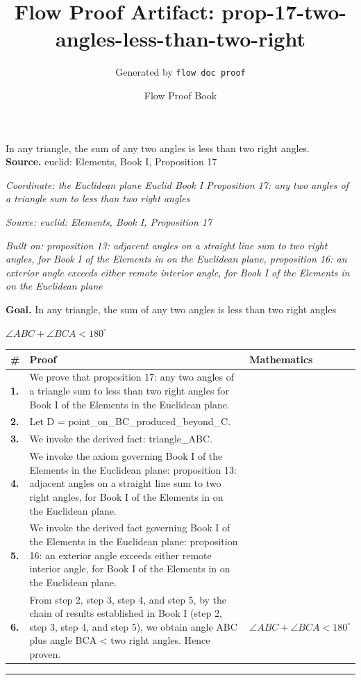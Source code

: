 \documentclass[11pt]{article}
\title{Flow Proof Artifact: prop-17-two-angles-less-than-two-right}
\author{Generated by \texttt{flow doc proof}}
\date{Flow Proof Book}
\theoremstyle{definition}
\begin{document}
\maketitle
In any triangle, the sum of any two angles is less than two right angles.\\[0.5em]
\textbf{Source.} euclid: Elements, Book I, Proposition 17\\[0.5em]
\bigskip
{}\par
\smallskip\noindent\textit{Coordinate: the Euclidean plane \cdot Euclid Book I \cdot Proposition 17: any two angles of a triangle sum to less than two right angles}\par
\smallskip\noindent\textit{Source: euclid: Elements, Book I, Proposition 17}\par
\smallskip\noindent\textit{Built on: proposition 13: adjacent angles on a straight line sum to two right angles, for Book I of the Elements in on the Euclidean plane, proposition 16: an exterior angle exceeds either remote interior angle, for Book I of the Elements in on the Euclidean plane}\par
\medskip
\noindent\textbf{Goal.} In any triangle, the sum of any two angles is less than two right angles\par
\noindent$\displaystyle \angle ABC + \angle BCA < 180^\circ$\par
\medskip
\noindent
\begin{tabular}{@{} >{\raggedright\arraybackslash}p{} >{\raggedright\arraybackslash}p{} >{\raggedleft\arraybackslash}p{} @{}}
\textbf{\#} & \textbf{Proof} & \textbf{Mathematics} \\
\midrule
\textbf{1.} & We prove that proposition 17: any two angles of a triangle sum to less than two right angles for Book I of the Elements in the Euclidean plane. & \\[0.45em]
\textbf{2.} & Let D = point\_on\_BC\_produced\_beyond\_C. & \\[0.45em]
\textbf{3.} & We invoke the derived fact: triangle\_ABC. & \\[0.45em]
\textbf{4.} & We invoke the axiom governing Book I of the Elements in the Euclidean plane: proposition 13: adjacent angles on a straight line sum to two right angles, for Book I of the Elements in on the Euclidean plane. & \\[0.45em]
\textbf{5.} & We invoke the derived fact governing Book I of the Elements in the Euclidean plane: proposition 16: an exterior angle exceeds either remote interior angle, for Book I of the Elements in on the Euclidean plane. & \\[0.45em]
\textbf{6.} & From step 2, step 3, step 4, and step 5, by the chain of results established in Book I (step 2, step 3, step 4, and step 5), we obtain angle ABC plus angle BCA < two right angles. Hence proven. & $\displaystyle \angle ABC + \angle BCA < 180^\circ$ \\[0.45em]
\bottomrule
\end{tabular}
\label{thm:Geometry-Euclid Book I-proposition_17_any_two_angles_of_a_triangle_sum_to_less_than_two_right_angles}
\par\medskip\hrule
\end{document}
